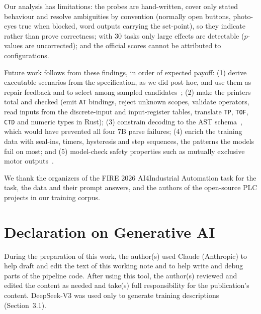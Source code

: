\documentclass{ceurart}
\begin{document}
Our analysis has limitations: the probes are hand-written, cover only stated behaviour and resolve ambiguities by convention (normally open buttons, photo-eyes true when blocked, word outputs carrying the set-point), so they indicate rather than prove correctness; with 30 tasks only large effects are detectable ($p$-values are uncorrected); and the official scores cannot be attributed to configurations.

Future work follows from these findings, in order of expected payoff: (1) derive executable scenarios from the specification, as we did post hoc, and use them as repair feedback and to select among sampled candidates~\cite{chen2023codet,ni2023lever}; (2) make the printers total and checked (emit \texttt{AT} bindings, reject unknown scopes, validate operators, read inputs from the discrete-input and input-register tables, translate \texttt{TP}, \texttt{TOF}, \texttt{CTD} and numeric types in Rust); (3) constrain decoding to the AST schema~\cite{geng2023gcd,willard2023outlines}, which would have prevented all four 7B parse failures; (4) enrich the training data with seal-ins, timers, hysteresis and step sequences, the patterns the models fail on most; and (5) model-check safety properties such as mutually exclusive motor outputs~\cite{darvas2015plcverif,ovatman2016overview}.

\begin{acknowledgments}
  We thank the organizers of the FIRE 2026 AI4Industrial Automation task for the task, the data and their prompt answers, and the authors of the open-source PLC projects in our training corpus.
\end{acknowledgments}

\section*{Declaration on Generative AI}
During the preparation of this work, the author(s) used Claude (Anthropic) to help draft and edit the text of this working note and to help write and debug parts of the pipeline code. After using this tool, the author(s) reviewed and edited the content as needed and take(s) full responsibility for the publication's content. DeepSeek-V3 was used only to generate training descriptions (Section~3.1).


\end{document}
